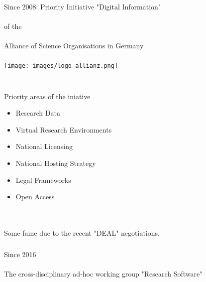 \documentclass{beamer}
\begin{document}
\begin{frame}
  \frametitle{}
  \begin{center}
    Since 2008: Priority Initiative "Digital Information"\\  \ \\
    of the\\ \ \\
    Alliance of Science Organisations in Germany\\
    \ \\
    \texttt{[image: images/logo\_allianz.png]}\\
    \ \\
  \end{center}
\end{frame}


\begin{frame}
  \frametitle{}
    \begin{block}{}
      \begin{center}
        Priority areas of the iniative\\
        \begin{itemize}
        \item Research Data
        \item Virtual Research Environments
        \item National Licensing
        \item National Hosting Strategy
        \item Legal Frameworks
        \item Open Access
        \end{itemize}
        \ \\ \ \\
        \pause Some fame due to the recent "DEAL" negotiations.
      \end{center}
    \end{block}
\end{frame}

\begin{frame}
  \frametitle{}
    \begin{block}{}
      \begin{center}
        Since 2016\\ \ \\
        The cross-disciplinary ad-hoc working group "Research Software"
      \end{center}
    \end{block}
\end{frame}
\end{document}
